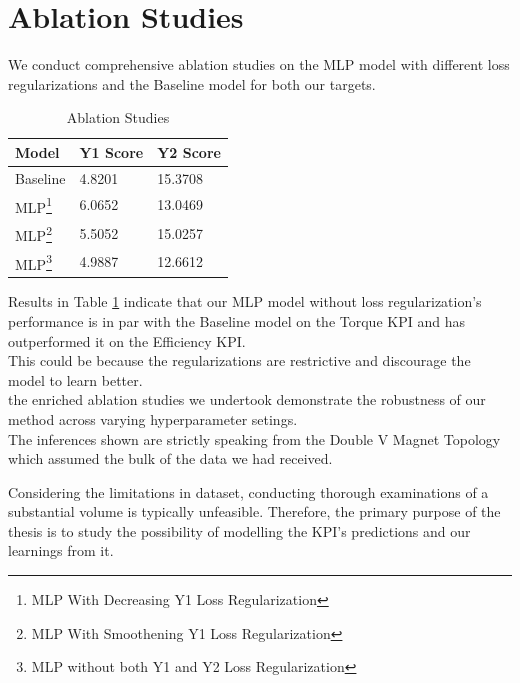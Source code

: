 \documentclass{report} %
\begin{document}
\section{Ablation Studies}\label{sec:Ablation Studies}

We conduct comprehensive ablation studies on the \ac{MLP} model with different loss regularizations and the Baseline model for both our targets.

\begin{minipage}[t]{\textwidth}
    \begin{table}[H]
        \centering
        \begin{tabular}{|p{}|p{}|p{}|}
        \hline {\bf Model} & {\bf Y1 Score} & {\bf Y2 Score}\\
        \hline 
        Baseline & 4.8201 & 15.3708 \\
        MLP\footnote{MLP With Decreasing Y1 Loss Regularization} & 6.0652 & 13.0469 \\
        MLP\footnote{MLP With Smoothening Y1 Loss Regularization} & 5.5052 & 15.0257 \\
        MLP\footnote{MLP without both Y1 and Y2 Loss Regularization} & 4.9887 & 12.6612  \\
        \hline
        \end{tabular}
        \caption{Ablation Studies}
        \label{tab:Ablation Studies}
    \end{table}
\end{minipage}

\vspace{1em} %

Results in Table \ref{tab:Ablation Studies} indicate that our \ac{MLP} model without loss regularization's performance is in par with the 
Baseline model on the Torque \ac{KPI} and has outperformed it on the Efficiency \ac{KPI}.\\
This could be because the regularizations are restrictive and discourage the model to learn better.\\
the enriched ablation studies we undertook demonstrate the robustness of our method across varying hyperparameter setings.\\
The inferences shown are strictly speaking from the Double V Magnet Topology which assumed the bulk of the data we had received.

Considering the limitations in dataset, conducting thorough examinations of a substantial volume is typically unfeasible. 
Therefore, the primary purpose of the thesis is to study the possibility of modelling the \ac{KPI}'s predictions and our learnings from it.\\
\end{document}
